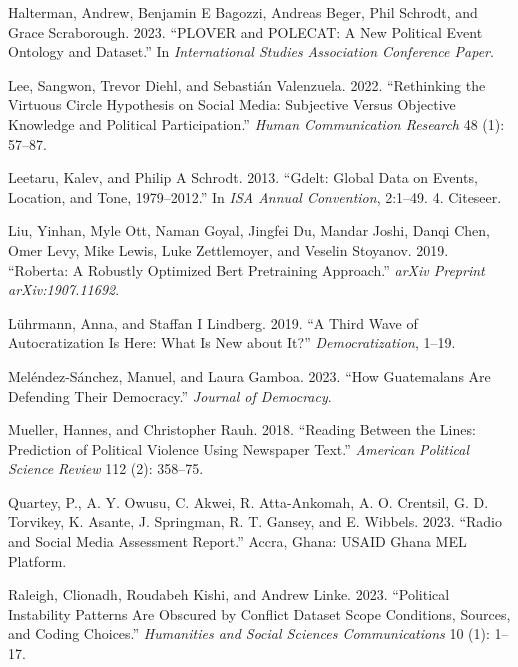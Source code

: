 \documentclass[
  letterpaper,
  DIV=11,
  numbers=noendperiod]{scrartcl}
\newlength{\cslhangindent}
\newlength{\cslentryspacingunit} %
\newenvironment{CSLReferences}[2] %
 {%
  \setlength{\parindent}{0pt}
  \ifodd #1
  \let\oldpar\par
  \def\par{\hangindent=\cslhangindent\oldpar}
  \fi
  \setlength{\parskip}{#2\cslentryspacingunit}
 }%
 {}
\begin{document}
\begin{CSLReferences}{1}{0}
\leavevmode{}%
Halterman, Andrew, Benjamin E Bagozzi, Andreas Beger, Phil Schrodt, and
Grace Scraborough. 2023. {``PLOVER and POLECAT: A New Political Event
Ontology and Dataset.''} In \emph{International Studies Association
Conference Paper}.

\leavevmode{}%
Lee, Sangwon, Trevor Diehl, and Sebastián Valenzuela. 2022.
{``Rethinking the Virtuous Circle Hypothesis on Social Media: Subjective
Versus Objective Knowledge and Political Participation.''} \emph{Human
Communication Research} 48 (1): 57--87.

\leavevmode{}%
Leetaru, Kalev, and Philip A Schrodt. 2013. {``Gdelt: Global Data on
Events, Location, and Tone, 1979--2012.''} In \emph{ISA Annual
Convention}, 2:1--49. 4. Citeseer.

\leavevmode{}%
Liu, Yinhan, Myle Ott, Naman Goyal, Jingfei Du, Mandar Joshi, Danqi
Chen, Omer Levy, Mike Lewis, Luke Zettlemoyer, and Veselin Stoyanov.
2019. {``Roberta: A Robustly Optimized Bert Pretraining Approach.''}
\emph{arXiv Preprint arXiv:1907.11692}.

\leavevmode{}%
Lührmann, Anna, and Staffan I Lindberg. 2019. {``A Third Wave of
Autocratization Is Here: What Is New about It?''}
\emph{Democratization}, 1--19.

\leavevmode{}%
Meléndez-Sánchez, Manuel, and Laura Gamboa. 2023. {``How Guatemalans Are
Defending Their Democracy.''} \emph{Journal of Democracy}.

\leavevmode{}%
Mueller, Hannes, and Christopher Rauh. 2018. {``Reading Between the
Lines: Prediction of Political Violence Using Newspaper Text.''}
\emph{American Political Science Review} 112 (2): 358--75.

\leavevmode{}%
Quartey, P., A. Y. Owusu, C. Akwei, R. Atta-Ankomah, A. O. Crentsil, G.
D. Torvikey, K. Asante, J. Springman, R. T. Gansey, and E. Wibbels.
2023. {``Radio and Social Media Assessment Report.''} Accra, Ghana:
USAID Ghana MEL Platform.

\leavevmode{}%
Raleigh, Clionadh, Roudabeh Kishi, and Andrew Linke. 2023. {``Political
Instability Patterns Are Obscured by Conflict Dataset Scope Conditions,
Sources, and Coding Choices.''} \emph{Humanities and Social Sciences
Communications} 10 (1): 1--17.


\end{CSLReferences}
\end{document}
